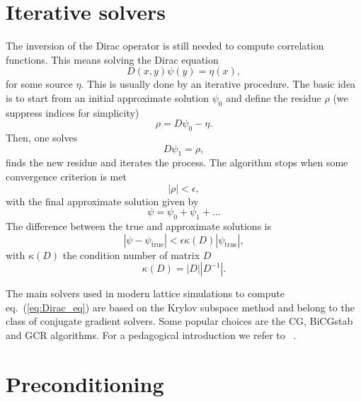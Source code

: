 \section{Iterative solvers}

The inversion of the Dirac operator is still needed to compute correlation functions. This means solving the Dirac equation
\begin{equation}
D(x,y)\psi(y)=\eta(x),
\end{equation}
for some source $\eta$. This is usually done by an iterative procedure. The basic idea is to start from an initial approximate solution $\psi_0$ and define the residue $\rho$ (we suppress indices for simplicity)
\begin{equation}
\rho=D\psi_0-\eta.
\end{equation}
Then, one solves
\begin{equation}
\label{eq:Dirac_eq}
D\psi_1=\rho,
\end{equation}
finds the new residue and iterates the process. The algorithm stops when some convergence criterion is met
\begin{equation}
|\rho|<\epsilon,
\end{equation}
with the final approximate solution given by
\begin{equation}
\psi=\psi_0+\psi_1+...
\end{equation}
The difference between the true and approximate solutions is
\begin{equation}
|\psi-\psi_{\textrm{true}}|<\epsilon\kappa(D)|\psi_{\textrm{true}}|,
\end{equation}
with $\kappa(D)$ the condition number of matrix $D$
\begin{equation}
\kappa(D)=|D||D^{-1}|.
\end{equation}

The main solvers used in modern lattice simulations to compute eq.~(\ref{eq:Dirac_eq}) are based on the Krylov subspace method and belong to the class of conjugate gradient solvers. Some popular choices are the CG, BiCGstab and GCR algorithms. For a pedagogical introduction we refer to ~\citep{Gattringer_Lang_2010,Luscher:2010ae}.

\section{Preconditioning}

